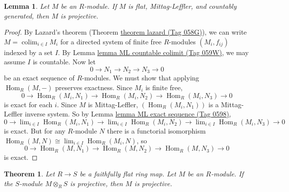 \documentclass{amsart}
\theoremstyle{plain}
\newtheorem{theorem}[subsection]{Theorem}
\newtheorem{lemma}[subsection]{Lemma}
\theoremstyle{definition}
\theoremstyle{remark}
\numberwithin{equation}{subsection}
\def\lim{\mathop{\mathrm{lim}}\nolimits}
\def\colim{\mathop{\mathrm{colim}}\nolimits}
\def\Hom{\mathop{\mathrm{Hom}}\nolimits}
\begin{document}
\begin{lemma}
\label{algebra-lemma-countgen-projective}
Let $M$ be an $R$-module.  If $M$ is flat, Mittag-Leffler, and countably
generated, then $M$ is projective.
\end{lemma}

\begin{proof}
By Lazard's theorem (Theorem \href{https://stacks.math.columbia.edu/tag/058G}{theorem lazard (Tag 058G)}), we can write $M =
\colim_{i
\in I} M_i$ for a directed system of finite free $R$-modules $(M_i, f_{ij})$
indexed by a set $I$.  By Lemma \href{https://stacks.math.columbia.edu/tag/059W}{lemma ML countable colimit (Tag 059W)}, we may assume
$I$ is countable.  Now let
$$
0 \to N_1 \to N_2 \to N_3 \to 0
$$
be an exact sequence of $R$-modules.  We must show that applying
$\Hom_R(M, -)$
preserves exactness.  Since $M_i$ is finite free,
$$
0 \to \Hom_R(M_i, N_1) \to \Hom_R(M_i, N_2) \to
\Hom_R(M_i, N_3) \to 0
$$
is exact for each $i$.  Since $M$ is Mittag-Leffler, $(\Hom_R(M_i,
N_{1}))$ is
a Mittag-Leffler inverse system.  So by Lemma \href{https://stacks.math.columbia.edu/tag/0598}{lemma ML exact sequence (Tag 0598)},
$$
0 \to \lim_{i \in I} \Hom_R(M_i, N_1) \to
\lim_{i \in I} \Hom_R(M_i, N_2) \to
\lim_{i \in I} \Hom_R(M_i, N_3) \to 0
$$
is exact.  But for any $R$-module $N$ there is a functorial isomorphism
$\Hom_R(M, N) \cong \lim_{i \in I} \Hom_R(M_i, N)$, so
$$
0 \to \Hom_R(M, N_1) \to \Hom_R(M, N_2) \to
\Hom_R(M, N_3) \to 0
$$
is exact.
\end{proof}


\begin{theorem}
\label{algebra-theorem-ffdescent-projectivity}
Let $R \to S$ be a faithfully flat ring map.  Let $M$ be an $R$-module.
 If the $S$-module $M \otimes_R S$ is projective, then $M$ is projective.
\end{theorem}
\end{document}

